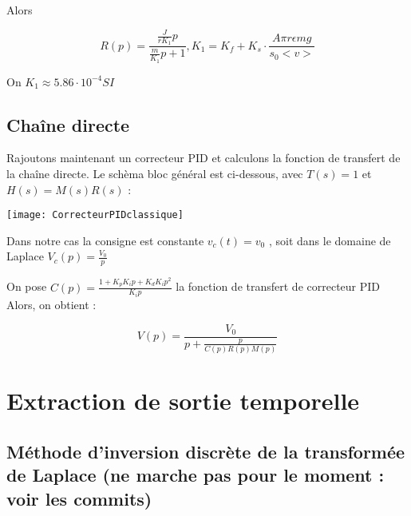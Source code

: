 \documentclass[11pt]{article} %
\begin{document}
Alors

\begin{equation} R(p) = \frac{\frac{J}{r K_1}p}{\frac{m}{K_1}p + 1} , K_1 = K_f + K_s \cdot \frac{A\pi r \epsilon mg}{s_0<v>} \end{equation}

On \begin{math} K_1 \approx 5.86 \cdot 10^{-4} SI \end{math}

\subsection{Chaîne directe}

Rajoutons maintenant un correcteur PID et calculons la fonction de transfert de la chaîne directe. Le schèma bloc général est ci-dessous, avec \begin{math} T(s) = 1 \end{math} et \begin{math} H(s) = M(s)R(s) \end{math} :

\texttt{[image: CorrecteurPIDclassique]} 

Dans notre cas la consigne est constante \begin{math} v_c(t) = v_0 \end{math} , soit dans le domaine de Laplace \begin{math} V_c(p) = \frac{V_0}{p} \end{math}

On pose \begin{math} C(p)  = \frac{1 + K_p K_i p + K_d K_i p^2}{K_i p}\end{math} la fonction de transfert de correcteur PID
Alors, on obtient :

\begin{equation} V(p) = \frac{V_0}{p + \frac{p}{C(p)R(p)M(p)}} \end{equation}


\section{Extraction de sortie temporelle}

\subsection{Méthode d'inversion discrète de la transformée de Laplace (ne marche pas pour le moment : voir les commits)}
\end{document}
